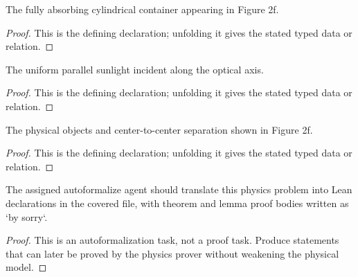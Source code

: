 \begin{definition}[FullyAbsorbingCylinder]
  \label{decl:physics:IPhO_2026_2_B_3:FullyAbsorbingCylinder}
  The fully absorbing cylindrical container appearing in Figure 2f.
\end{definition}
\begin{proof}
  This is the defining declaration; unfolding it gives the stated typed data or relation.
\end{proof}

\begin{definition}[SunlightBeam]
  \label{decl:physics:IPhO_2026_2_B_3:SunlightBeam}
  The uniform parallel sunlight incident along the optical axis.
\end{definition}
\begin{proof}
  This is the defining declaration; unfolding it gives the stated typed data or relation.
\end{proof}

\begin{definition}
  \label{decl:physics:IPhO_2026_2_B_3:Figure2fSetup}
  The physical objects and center-to-center separation shown in Figure 2f.
\end{definition}
\begin{proof}
  This is the defining declaration; unfolding it gives the stated typed data or relation.
\end{proof}

\begin{theorem}
\label{thm:physics:IPhO_2026_2_B_3:target}
The assigned autoformalize agent should translate this physics problem into Lean declarations in the covered file, with theorem and lemma proof bodies written as `by sorry`.
\end{theorem}
\begin{proof}
This is an autoformalization task, not a proof task. Produce statements that can later be proved by the physics prover without weakening the physical model.
\end{proof}
